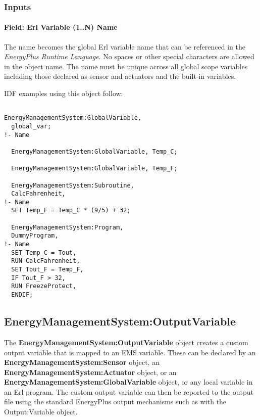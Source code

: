 \subsubsection{Inputs}\label{inputs-5-009}

\paragraph{Field: Erl Variable (1..N) Name}\label{field-erl-variable-1..n-name}

The name becomes the global Erl variable name that can be referenced in the \emph{EnergyPlus Runtime Language}. No spaces or other special characters are allowed in the object name. The name must be unique across all global scope variables including those declared as sensor and actuators and the built-in variables.

IDF examples using this object follow:

\begin{lstlisting}

EnergyManagementSystem:GlobalVariable,
  global_var;                                                                   !- Name

  EnergyManagementSystem:GlobalVariable, Temp_C;

  EnergyManagementSystem:GlobalVariable, Temp_F;

  EnergyManagementSystem:Subroutine,
  CalcFahrenheit,                                                           !- Name
  SET Temp_F = Temp_C * (9/5) + 32;

  EnergyManagementSystem:Program,
  DummyProgram,                                                               !- Name
  SET Temp_C = Tout,
  RUN CalcFahrenheit,
  SET Tout_F = Temp_F,
  IF Tout_F > 32,
  RUN FreezeProtect,
  ENDIF;
\end{lstlisting}

\subsection{EnergyManagementSystem:OutputVariable}\label{energymanagementsystemoutputvariable}

The \textbf{EnergyManagementSystem:OutputVariable} object creates a custom output variable that is mapped to an EMS variable. These can be declared by an \textbf{EnergyManagementSystem:Sensor} object, an \textbf{EnergyManagementSystem:Actuator} object, or an \textbf{EnergyManagementSystem:GlobalVariable} object, or any local variable in an Erl program. The custom output variable can then be reported to the output file using the standard EnergyPlus output mechanisms such as with the Output:Variable object.

